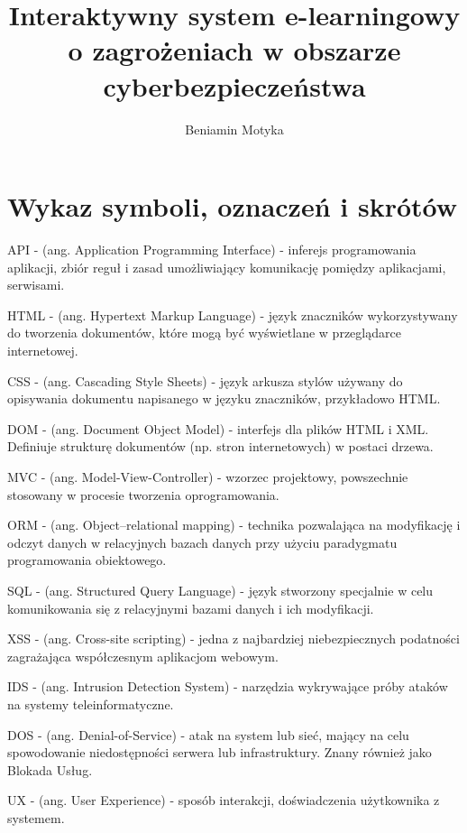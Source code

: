 \documentclass[12pt,twoside]{article}
\author{Beniamin Motyka}
\title{Interaktywny system e-learningowy o zagrożeniach w obszarze cyberbezpieczeństwa}
\begin{document}
\maketitle

\blankpage

\tableofcontents

\clearpage
\blankpage

\clearpage
\section*{Wykaz symboli, oznaczeń i skrótów}

API - (ang. Application Programming Interface) - inferejs programowania aplikacji, zbiór reguł i zasad umożliwiający komunikację pomiędzy aplikacjami, serwisami.

HTML - (ang. Hypertext Markup Language) - język znaczników wykorzystywany do tworzenia dokumentów, które mogą być wyświetlane w przeglądarce internetowej.

CSS - (ang. Cascading Style Sheets) - język arkusza stylów używany do opisywania dokumentu napisanego w języku znaczników, przykładowo HTML.

DOM - (ang. Document Object Model) - interfejs dla plików HTML i XML. Definiuje strukturę dokumentów (np. stron internetowych) w postaci drzewa.

MVC - (ang. Model-View-Controller) - wzorzec projektowy, powszechnie stosowany w procesie tworzenia oprogramowania. 

ORM - (ang. Object–relational mapping) - technika pozwalająca na modyfikację i odczyt danych w relacyjnych bazach danych przy użyciu paradygmatu programowania obiektowego.

SQL - (ang. Structured Query Language) - język stworzony specjalnie w celu komunikowania się z relacyjnymi bazami danych i ich modyfikacji.

XSS - (ang. Cross-site scripting) - jedna z najbardziej niebezpiecznych podatności zagrażająca współczesnym aplikacjom webowym. 

IDS - (ang. Intrusion Detection System) - narzędzia wykrywające próby ataków na systemy teleinformatyczne.

DOS - (ang. Denial-of-Service) - atak na system lub sieć, mający na celu spowodowanie niedostępności serwera lub infrastruktury. Znany również jako Blokada Usług.

UX - (ang. User Experience) - sposób interakcji, doświadczenia użytkownika z systemem.
\end{document}

